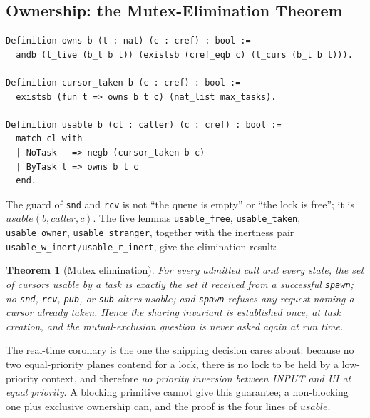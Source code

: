 \documentclass[10pt,journal,compsoc,twocolumn]{article}
\newtheorem{theorem}{Theorem}[section]
\theoremstyle{definition}
\theoremstyle{remark}
\theoremstyle{plain}
\newcommand{\ctr}[1]{\texttt{#1}}
\begin{document}
\subsection{Ownership: the Mutex-Elimination Theorem}
\label{sec:ownership}
\begin{lstlisting}[language=Coq]
Definition owns b (t : nat) (c : cref) : bool :=
  andb (t_live (b_t b t)) (existsb (cref_eqb c) (t_curs (b_t b t))).

Definition cursor_taken b (c : cref) : bool :=
  existsb (fun t => owns b t c) (nat_list max_tasks).

Definition usable b (cl : caller) (c : cref) : bool :=
  match cl with
  | NoTask   => negb (cursor_taken b c)
  | ByTask t => owns b t c
  end.
\end{lstlisting}
The guard of \ctr{snd} and \ctr{rcv} is not ``the queue is empty'' or ``the lock is free''; it is \(\mathit{usable}(b, \mathit{caller}, c)\). The five lemmas \ctr{usable\_free}, \ctr{usable\_taken}, \ctr{usable\_owner}, \ctr{usable\_stranger}, together with the inertness pair \ctr{usable\_w\_inert}/\ctr{usable\_r\_inert}, give the elimination result:
\begin{theorem}[Mutex elimination]
\label{thm:mutex}
For every admitted call and every state, the set of cursors usable by a task is exactly the set it received from a successful \ctr{spawn}; no \ctr{snd}, \ctr{rcv}, \ctr{pub}, or \ctr{sub} alters \(\mathit{usable}\); and \ctr{spawn} refuses any request naming a cursor already taken. Hence the sharing invariant is established once, at task creation, and the mutual-exclusion question is never asked again at run time.
\end{theorem}
The real-time corollary is the one the shipping decision cares about: because no two equal-priority planes contend for a lock, there is no lock to be held by a low-priority context, and therefore \emph{no priority inversion between INPUT and UI at equal priority}. A blocking primitive cannot give this guarantee; a non-blocking one plus exclusive ownership can, and the proof is the four lines of \(\mathit{usable}\).
\end{document}

